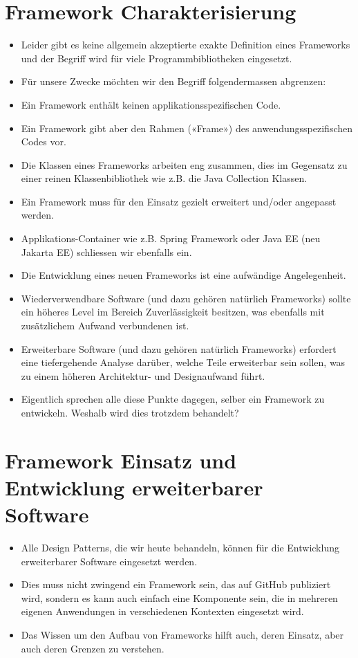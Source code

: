 \documentclass[10pt]{article}
\begin{document}
\section*{Framework Charakterisierung}
\begin{itemize}
  \item Leider gibt es keine allgemein akzeptierte exakte Definition eines Frameworks und der Begriff wird für viele Programmbibliotheken eingesetzt.
  \item Für unsere Zwecke möchten wir den Begriff folgendermassen abgrenzen:
  \item Ein Framework enthält keinen applikationsspezifischen Code.
  \item Ein Framework gibt aber den Rahmen («Frame») des anwendungsspezifischen Codes vor.
  \item Die Klassen eines Frameworks arbeiten eng zusammen, dies im Gegensatz zu einer reinen Klassenbibliothek wie z.B. die Java Collection Klassen.
  \item Ein Framework muss für den Einsatz gezielt erweitert und/oder angepasst werden.
  \item Applikations-Container wie z.B. Spring Framework oder Java EE (neu Jakarta EE) schliessen wir ebenfalls ein.
  \item Die Entwicklung eines neuen Frameworks ist eine aufwändige Angelegenheit.
  \item Wiederverwendbare Software (und dazu gehören natürlich Frameworks) sollte ein höheres Level im Bereich Zuverlässigkeit besitzen, was ebenfalls mit zusätzlichem Aufwand verbundenen ist.
  \item Erweiterbare Software (und dazu gehören natürlich Frameworks) erfordert eine tiefergehende Analyse darüber, welche Teile erweiterbar sein sollen, was zu einem höheren Architektur- und Designaufwand führt.
  \item Eigentlich sprechen alle diese Punkte dagegen, selber ein Framework zu entwickeln. Weshalb wird dies trotzdem behandelt?
\end{itemize}

\section*{Framework Einsatz und Entwicklung erweiterbarer Software}
\begin{itemize}
  \item Alle Design Patterns, die wir heute behandeln, können für die Entwicklung erweiterbarer Software eingesetzt werden.
  \item Dies muss nicht zwingend ein Framework sein, das auf GitHub publiziert wird, sondern es kann auch einfach eine Komponente sein, die in mehreren eigenen Anwendungen in verschiedenen Kontexten eingesetzt wird.
  \item Das Wissen um den Aufbau von Frameworks hilft auch, deren Einsatz, aber auch deren Grenzen zu verstehen.
\end{itemize}
\end{document}
